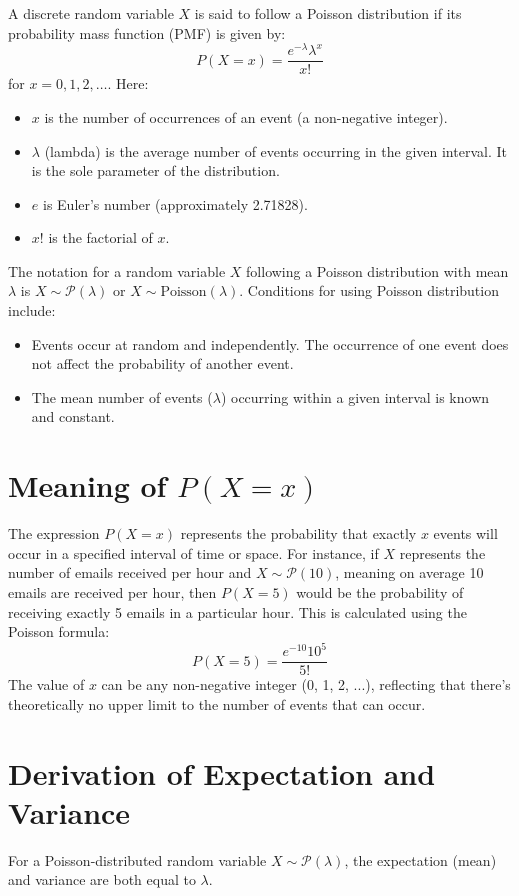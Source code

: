 \begin{definition}
  \label{def:poisson}
  A discrete random variable \(X\) is said to follow a Poisson distribution if its probability mass function (PMF) is given by:
  \[ P(X=x) = \frac{e^{-\lambda} \lambda^x}{x!} \]
  for \(x = 0, 1, 2, \ldots\).
  Here:
  \begin{itemize}
    \item \(x\) is the number of occurrences of an event (a non-negative integer).
    \item \(\lambda\) (lambda) is the average number of events occurring in the given interval. It is the sole parameter of the distribution.
    \item \(e\) is Euler's number (approximately 2.71828).
    \item \(x!\) is the factorial of \(x\).
  \end{itemize}
  The notation for a random variable \(X\) following a Poisson distribution with mean \(\lambda\) is \(X \sim \mathcal{P}(\lambda)\) or \(X \sim \text{Poisson}(\lambda)\).
  Conditions for using Poisson distribution include:
  \begin{itemize}
    \item Events occur at random and independently. The occurrence of one event does not affect the probability of another event.
    \item The mean number of events (\(\lambda\)) occurring within a given interval is known and constant.
  \end{itemize}
\end{definition}

\section{Meaning of \(P(X=x)\)}
The expression \(P(X=x)\) represents the probability that exactly \(x\) events will occur in a specified interval of time or space. For instance, if \(X\) represents the number of emails received per hour and \(X \sim \mathcal{P}(10)\), meaning on average 10 emails are received per hour, then \(P(X=5)\) would be the probability of receiving exactly 5 emails in a particular hour. This is calculated using the Poisson formula:
\[ P(X=5) = \frac{e^{-10} 10^5}{5!} \]
The value of \(x\) can be any non-negative integer (0, 1, 2, ...), reflecting that there's theoretically no upper limit to the number of events that can occur.

\section{Derivation of Expectation and Variance}
For a Poisson-distributed random variable \(X \sim \mathcal{P}(\lambda)\), the expectation (mean) and variance are both equal to \(\lambda\). 

